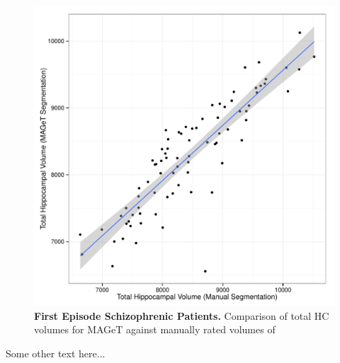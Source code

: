 \documentclass{article}\usepackage{graphicx, color}
\makeatletter
\def\maxwidth{ %
  \ifdim\Gin@nat@width>\linewidth
    \linewidth
  \else
    \Gin@nat@width
  \fi
}
\newenvironment{knitrout}{}{} %
\makeatother
\begin{document}
\begin{figure}
\begin{knitrout}
\color{fgcolor}

{\centering \includegraphics[width=\maxwidth]{figure/SZ_volumes} 

}


\end{knitrout}

  \caption{{\bf First Episode Schizophrenic Patients.} Comparison of total HC volumes for MAGeT against manually rated volumes of}
  \label{SZ_volumes}
\end{figure}

Some other text here... 
\end{document}
